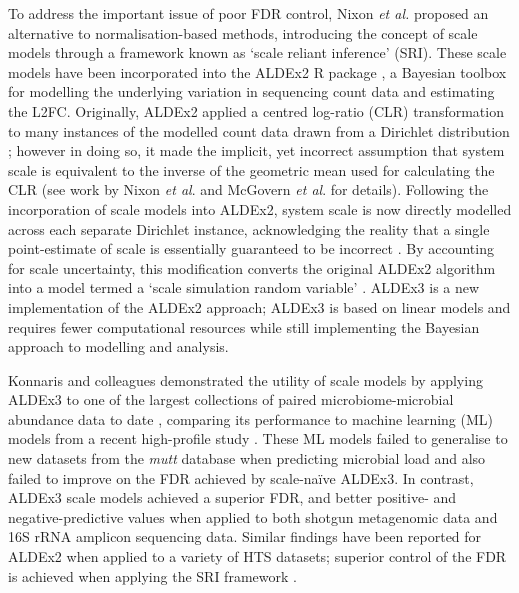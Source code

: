 \documentclass[10pt,letterpaper]{article}
\begin{document}
To address the important issue of poor FDR control, Nixon \textit{et al.} \cite{nixon_scale_2024} proposed an alternative to normalisation-based methods, introducing the concept of scale models through a framework known as `scale reliant inference' (SRI). These scale models have  been incorporated into the ALDEx2 R package \cite{gloor_explicit_2025}, a Bayesian toolbox for modelling the underlying variation in sequencing count data and estimating the L2FC. Originally, ALDEx2 applied a centred log-ratio (CLR) transformation to many instances of the modelled count data drawn from a Dirichlet distribution \cite{fernandes:2014}; however in doing so, it made the implicit, yet incorrect assumption that system scale is equivalent to the inverse of the geometric mean used for calculating the CLR (see work by Nixon \textit{et al}. \cite{nixon_scale_2024} and McGovern \textit{et al}. \cite{mcgovern_addressing_2023} for details). Following the incorporation of scale models into ALDEx2, system scale is now directly modelled across each separate Dirichlet instance, acknowledging the reality that a single point-estimate of scale is essentially guaranteed to be incorrect \cite{gloor_explicit_2025}. By accounting for scale uncertainty, this modification converts the original ALDEx2 algorithm into a  model termed a `scale simulation random variable' \cite{nixon_scale_2024}. ALDEx3 is a new implementation of the ALDEx2 approach; ALDEx3 is based on linear models and  requires fewer computational  resources while still implementing the Bayesian approach to modelling and analysis.

Konnaris and colleagues demonstrated the utility of scale models by applying ALDEx3 to one of the largest collections of paired microbiome-microbial abundance data to date \cite{konnaris_uncertainty_2025}, comparing its performance to machine learning (ML) models from a recent high-profile study \cite{nishijima_fecal_2025}. These ML models failed to generalise to new datasets from the \textit{mutt} database \cite{konnaris_uncertainty_2025} when predicting microbial load and also failed to improve on the FDR achieved by scale-na\"ive ALDEx3. In contrast, ALDEx3 scale models achieved a superior FDR, and better positive- and negative-predictive values when applied to both shotgun metagenomic data and 16S rRNA amplicon sequencing data. Similar findings have been reported for ALDEx2 when applied to a variety of HTS datasets; superior control of the FDR is achieved when applying the SRI framework \cite{gloor_explicit_2025}.
\end{document}
